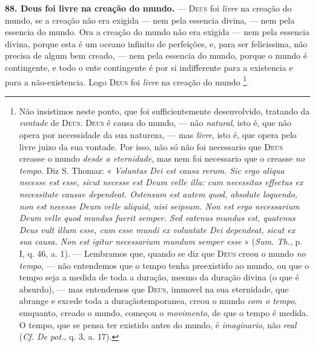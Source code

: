  \textbf{88. Deus foi livre na creação do mundo.} --- \textsc{Deus} foi \emph{livre} na creação do mundo, se a creação não era exigida --- nem pela essencia divina, --- nem pela essencia do mundo. Ora a creação do mundo não era exigida --- nem pela essencia divina, porque esta é um oceano infinito de perfeições, e, para ser felicissima, não precisa de algum bem creado, --- nem pela essencia do mundo, porque o mundo é contingente, e todo o ente contingente é por si indifferente para a existencia e para a não-existencia. Logo \textsc{Deus} foi \emph{livre} na creação do mundo \footnote{Não insistimos neste ponto, que foi sufficientemente desenvolvido, tratando da \emph{vontade} de \textsc{Deus}. \textsc{Deus} é causa do mundo, --- não \emph{natural}, isto é, que não opera por necessidade da sua natureza, --- mas \emph{livre}, isto é, que opera pelo livre juizo da sua vontade. Por isso, não só não foi necessario que \textsc{Deus} creasse o mundo \emph{desde a eternidade}, mas nem foi necessario que o creasse \emph{no tempo}. Diz S. Thomaz: « \emph{Voluntas Dei est causa rerum. Sic ergo aliqua necesse est esse, sicut necesse est Deum velle illa: cum necessitas effectus ex necessitate causae dependeat. Ostensum est autem quod, absolute loquendo, non est necesse Deum velle aliquid, nisi seipsum. Non est ergo necessarium Deum velle quod mundus fuerit semper. Sed eatenus mundus est, quatenus Deus vult illum esse, cum esse mundi ex voluntate Dei dependeat, sicut ex sua causa. Non est \emph{igitur} necessarium mundum semper esse} » (\emph{Sum. Th.}, p. I, q. 46, a. 1). --- Lembramos que, quando se diz que \textsc{Deus} creou o mundo \emph{no tempo}, --- não entendemos que o tempo tenha preexistido ao mundo, ou que o tempo seja a medida de toda a duração, mesmo da duração divina (o que é absurdo), --- mas entendemos que \textsc{Deus}, immovel na sua eternidade, que abrange e excede toda a duraçãotemporanea, creou o mundo \emph{com o tempo}, emquanto, creado o mundo, começou o \emph{movimento}, de que o tempo é medida. O tempo, que se pensa ter existido antes do mundo, é \emph{imaginario}, não \emph{real} (\emph{Cf. De pot.}, q. 3, a. 17).}.

